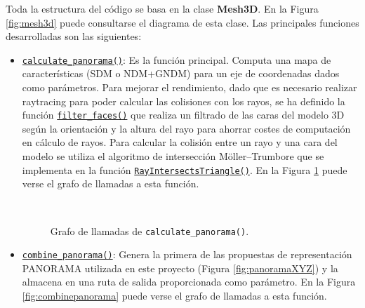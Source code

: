 Toda la estructura del código se basa en la clase \textbf{Mesh3D}. En la Figura \ref{fig:mesh3d} puede consultarse el diagrama de esta clase. Las principales funciones desarrolladas son las siguientes:


\begin{itemize}
    \item \href{https://alexmnzlms.github.io/panorama_extended/classMesh3D.html#a0a984cd43ac240bc77aedaa564824fbb}{\texttt{calculate\_panorama()}}: Es la función principal. Computa una mapa de características (SDM o NDM+GNDM) para un eje de coordenadas dados como parámetros. Para mejorar el rendimiento, dado que es necesario realizar raytracing para poder calcular las colisiones con los rayos, se ha definido la función \href{https://alexmnzlms.github.io/panorama_extended/classMesh3D.html#a8cfc87c76eed8c2e11c14f87d2e2788a}{\texttt{filter\_faces()}} que realiza un filtrado de las caras del modelo 3D según la orientación y la altura del rayo para ahorrar costes de computación en cálculo de rayos. Para calcular la colisión entre un rayo y una cara del modelo se utiliza el algoritmo de intersección Möller–Trumbore \cite{Moller97} que se implementa en la función \href{https://alexmnzlms.github.io/panorama_extended/classMesh3D.html#afae60cf7754feb072082d08d46660609}{\texttt{RayIntersectsTriangle()}}. En la Figura \ref{fig:calculatepanorama} puede verse el grafo de llamadas a esta función.
    \begin{figure}[ht!]
        \centering
        \\
        \caption{Grafo de llamadas de \texttt{calculate\_panorama()}.}
        \label{fig:calculatepanorama}
    \end{figure}
    \item \href{https://alexmnzlms.github.io/panorama_extended/classMesh3D.html#abcfbcc10775544bcf4c5d1d706dd23b5}{\texttt{combine\_panorama()}}: Genera la primera de las propuestas de representación PANORAMA utilizada en este proyecto (Figura \ref{fig:panoramaXYZ}) y la almacena en una ruta de salida proporcionada como parámetro. En la Figura \ref{fig:combinepanorama} puede verse el grafo de llamadas a esta función.

\end{itemize}

